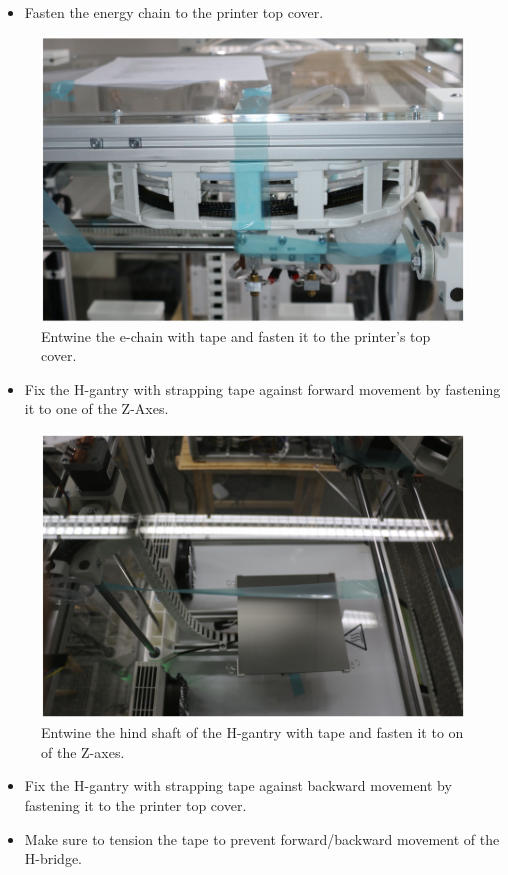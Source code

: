 \begin{itemize}
  \item Fasten the energy chain to the printer top cover. 
\end{itemize}

\begin{figure}[H]
  \centering
  \includegraphics[width=.7\linewidth]{./img/secure_echain.png}
  \caption{Entwine the e-chain with tape and fasten it to the printer's top cover.} 
\end{figure}

\begin{itemize}
  \item Fix the H-gantry with strapping tape against forward movement by fastening it to one of the Z-Axes. 
\end{itemize}

\begin{figure}[H]
  \centering
  \includegraphics[width=.7\linewidth]{./img/secure_hbridge_rear.png}
  \caption{Entwine the hind shaft of the H-gantry with tape and fasten it to on of the Z-axes.}
\end{figure}

\begin{itemize}
  \item Fix the H-gantry with strapping tape against backward movement by fastening it to the printer top cover.
  \item Make sure to tension the tape to prevent forward/backward movement of the H-bridge. 
\end{itemize}

